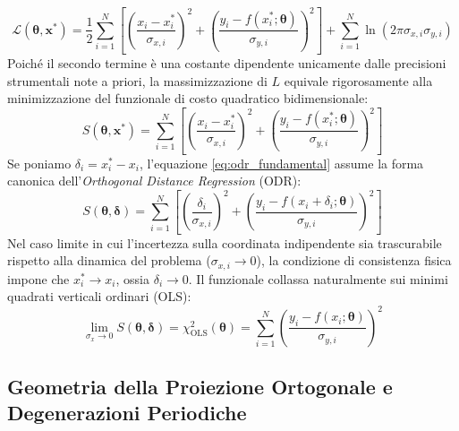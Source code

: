 \documentclass[11pt,a4paper]{article}
\begin{document}
\begin{equation}
    \mathcal{L}(\boldsymbol{\theta}, \mathbf{x}^*) = \frac{1}{2} \sum_{i=1}^N \left[ \left(\frac{x_i - x_i^*}{\sigma_{x, i}}\right)^2 + \left(\frac{y_i - f(x_i^*; \boldsymbol{\theta})}{\sigma_{y, i}}\right)^2 \right] + \sum_{i=1}^N \ln(2\pi \sigma_{x, i} \sigma_{y, i})
\end{equation}
Poiché il secondo termine è una costante dipendente unicamente dalle precisioni strumentali note a priori, la massimizzazione di $L$ equivale rigorosamente alla minimizzazione del funzionale di costo quadratico bidimensionale:
\begin{equation}
    S(\boldsymbol{\theta}, \mathbf{x}^*) = \sum_{i=1}^N \left[ \left(\frac{x_i - x_i^*}{\sigma_{x, i}}\right)^2 + \left(\frac{y_i - f(x_i^*; \boldsymbol{\theta})}{\sigma_{y, i}}\right)^2 \right]
    \label{eq:odr_fundamental}
\end{equation}
Se poniamo $\delta_i = x_i^* - x_i$, l'equazione \eqref{eq:odr_fundamental} assume la forma canonica dell'\emph{Orthogonal Distance Regression} (ODR):
\begin{equation}
    S(\boldsymbol{\theta}, \boldsymbol{\delta}) = \sum_{i=1}^N \left[ \left(\frac{\delta_i}{\sigma_{x, i}}\right)^2 + \left(\frac{y_i - f(x_i + \delta_i; \boldsymbol{\theta})}{\sigma_{y, i}}\right)^2 \right]
\end{equation}
Nel caso limite in cui l'incertezza sulla coordinata indipendente sia trascurabile rispetto alla dinamica del problema ($\sigma_{x, i} \to 0$), la condizione di consistenza fisica impone che $x_i^* \to x_i$, ossia $\delta_i \to 0$. Il funzionale collassa naturalmente sui minimi quadrati verticali ordinari (OLS):
\begin{equation}
    \lim_{\sigma_x \to 0} S(\boldsymbol{\theta}, \boldsymbol{\delta}) = \chi^2_{\text{OLS}}(\boldsymbol{\theta}) = \sum_{i=1}^N \left(\frac{y_i - f(x_i; \boldsymbol{\theta})}{\sigma_{y, i}}\right)^2
\end{equation}

\subsection{Geometria della Proiezione Ortogonale e Degenerazioni Periodiche}
\end{document}
